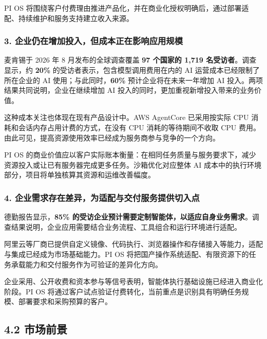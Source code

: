PI OS 将围绕客户付费理由推进产品化，并在商业化授权明确后，通过部署适配、持续维护和服务支持建立收入来源。

\subsubsection{3. 企业仍在增加投入，但成本正在影响应用规模}\label{ux4f01ux4e1aux4ecdux5728ux589eux52a0ux6295ux5165ux4f46ux6210ux672cux6b63ux5728ux5f71ux54cdux5e94ux7528ux89c4ux6a21}

麦肯锡于 2026 年 8 月发布的全球调查覆盖 \textbf{97 个国家的 1,719 名受访者}。调查显示，约 \textbf{20\%} 的受访者表示，包含模型调用费用在内的 AI 运营成本已经限制了所在企业的 AI 使用；与此同时，\textbf{60\%} 预计企业将在未来一年增加 AI 投入。两项结果共同说明，企业在继续增加 AI 投入的同时，更加重视新增投入带来的业务价值。

这种成本关注也体现在现有产品设计中。AWS AgentCore 已采用按实际 CPU 消耗和会话内存占用计费的方式，在没有 CPU 消耗的等待期间不收取 CPU 费用。由此可见，提高资源使用效率已经成为服务商参与竞争的一个方向。

PI OS 的商业价值应以客户实际账本衡量：在相同任务质量与服务要求下，减少资源投入或让已有服务器完成更多任务。沙箱优化对应整体 AI 成本中的执行环境部分，项目将单独核算其资源和运维改善幅度。

\subsubsection{4. 企业需求存在差异，为适配与交付服务提供切入点}\label{ux4f01ux4e1aux9700ux6c42ux5b58ux5728ux5deeux5f02ux4e3aux9002ux914dux4e0eux4ea4ux4ed8ux670dux52a1ux63d0ux4f9bux5207ux5165ux70b9}

德勤报告显示，\textbf{85\% 的受访企业预计需要定制智能体，以适应自身业务需求}。调查结果说明，企业应用需要结合业务流程、工具组合和运行环境进行适配。

阿里云等厂商已提供自定义镜像、代码执行、浏览器操作和存储接入等能力，适配与集成已经成为市场基础能力。PI OS 将把国产操作系统适配、有限资源下的任务承载能力和交付服务作为可验证的差异化方向。

企业采用、公开收费和资本参与等信号表明，智能体执行基础设施已经进入商业化阶段。PI OS 将通过客户试点验证付费转化，当前重点是识别具有明确任务规模、部署要求和采购预算的客户。

\subsection{4.2 市场前景}\label{ux5e02ux573aux524dux666f}

